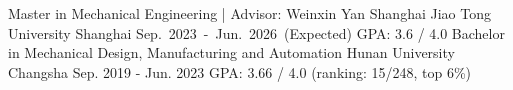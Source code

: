 
\begin{cventries}
	\cventry
	{Master in Mechanical Engineering | Advisor: Weinxin Yan} %
	{Shanghai Jiao Tong University} %
	{Shanghai} %
	{Sep.~2023~-~Jun.~2026~(Expected)} %
	{
        GPA: 3.6 / 4.0
	}%
	\cventry
	{Bachelor in Mechanical Design, Manufacturing and Automation} %
	{Hunan University} %
	{Changsha} %
	{Sep. 2019 - Jun. 2023} %
	{
        GPA: 3.66 / 4.0 (ranking: 15/248, top 6\%)
	}%
	\vspace{2mm}
\end{cventries}

